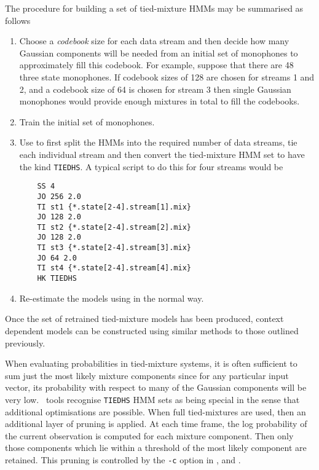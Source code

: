 The procedure for building a set of tied-mixture HMMs may be summarised
as follows
\begin{enumerate}
\item Choose a {\it codebook} size for each data stream and then 
   decide how many Gaussian components will be needed from an initial set of
    monophones to approximately fill this codebook.
    For example, suppose that there are 48 three state monophones.  If
    codebook sizes of 128 are chosen for streams 1 and 2, and
    a codebook size of 64 is chosen for stream 3 then single Gaussian
    monophones would provide enough mixtures in total to fill the codebooks.
\item Train the initial set of monophones.
\item Use  to first split the HMMs into the required number of
    data streams, tie
    each individual stream and then convert the tied-mixture HMM set to 
    have the kind \texttt{TIEDHS}.  
    A typical script to do this for four streams would be
\begin{verbatim}
    SS 4
    JO 256 2.0
    TI st1 {*.state[2-4].stream[1].mix}
    JO 128 2.0
    TI st2 {*.state[2-4].stream[2].mix}
    JO 128 2.0
    TI st3 {*.state[2-4].stream[3].mix}
    JO 64 2.0
    TI st4 {*.state[2-4].stream[4].mix}
    HK TIEDHS
\end{verbatim}
\item Re-estimate the models using  in the normal way.
\end{enumerate}
Once the set of retrained tied-mixture models has been produced, context
dependent models can be constructed using similar methods to those
outlined previously.

When evaluating probabilities in tied-mixture systems, it is often
sufficient to sum just the most likely mixture components since for any
particular input vector, its probability with respect to many of the Gaussian
components will be very low.
\HTK\ tools recognise \texttt{TIEDHS}
HMM sets as being special in the sense that additional optimisations
are possible. When full tied-mixtures are used, then an additional layer of pruning
is applied.  At each time frame, the log probability of the current observation
is computed for each mixture component.  Then only those components which lie within
a threshold of the most likely component are retained.  This 
pruning is controlled by the \texttt{-c} option in 
,  and .

